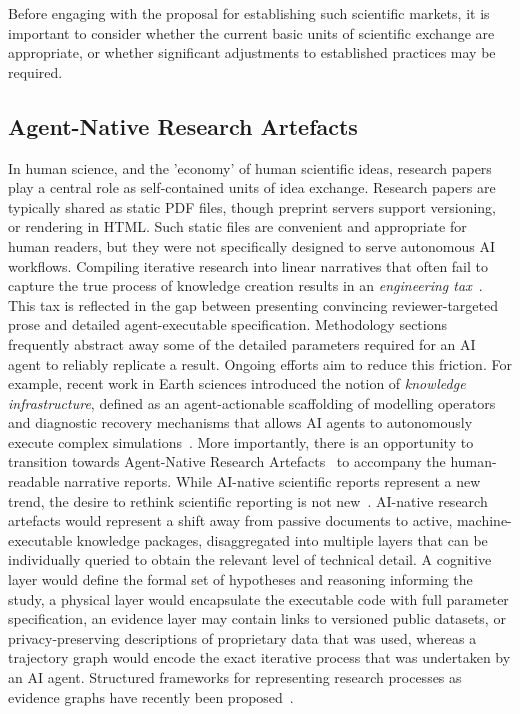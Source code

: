 \documentclass[11pt, a4paper, twocolumn, goog]{google}
\begin{document}
Before engaging with the proposal for establishing such scientific markets, it is important to consider whether the current basic units of scientific exchange are appropriate, or whether significant adjustments to established practices may be required.

\subsection{Agent-Native Research Artefacts}
\label{sec:artifacts}

In human science, and the 'economy' of human scientific ideas, research papers play a central role as self-contained units of idea exchange. Research papers are typically shared as static PDF files, though preprint servers support versioning, or rendering in HTML. Such static files are convenient and appropriate for human readers, but they were not specifically designed to serve autonomous AI workflows. Compiling iterative research into linear narratives that often fail to capture the true process of knowledge creation results in an \emph{engineering tax}~\citep{liu2026humanwrittenpaperagentnativeresearch}. This tax is reflected in the gap between presenting convincing reviewer-targeted prose and detailed agent-executable specification. Methodology sections frequently abstract away some of the detailed parameters required for an AI agent to reliably replicate a result. Ongoing efforts aim to reduce this friction. For example, recent work in Earth sciences introduced the notion of \emph{knowledge infrastructure}, defined as an agent-actionable scaffolding of modelling operators and diagnostic recovery mechanisms that allows AI agents to autonomously execute complex simulations~\citep{li2026kissknowledgeinfrastructure}. More importantly, there is an opportunity to transition towards Agent-Native Research Artefacts~\citep{liu2026humanwrittenpaperagentnativeresearch} to accompany the human-readable narrative reports. While AI-native scientific reports represent a new trend, the desire to rethink scientific reporting is not new~\citep{groth2010anatomy, strijkers2011toward, de2020fair, schultes2022comparative, soiland2022packaging}. AI-native research artefacts would represent a shift away from passive documents to active, machine-executable knowledge packages, disaggregated into multiple layers that can be individually queried to obtain the relevant level of technical detail. A cognitive layer would define the formal set of hypotheses and reasoning informing the study, a physical layer would encapsulate the executable code with full parameter specification, an evidence layer may contain links to versioned public datasets, or privacy-preserving descriptions of proprietary data that was used, whereas a trajectory graph would encode the exact iterative process that was undertaken by an AI agent. Structured frameworks for representing research processes as evidence graphs have recently been proposed~\citep{ren2026evigraphevidenceguidedautonomousresearch}.
\end{document}

